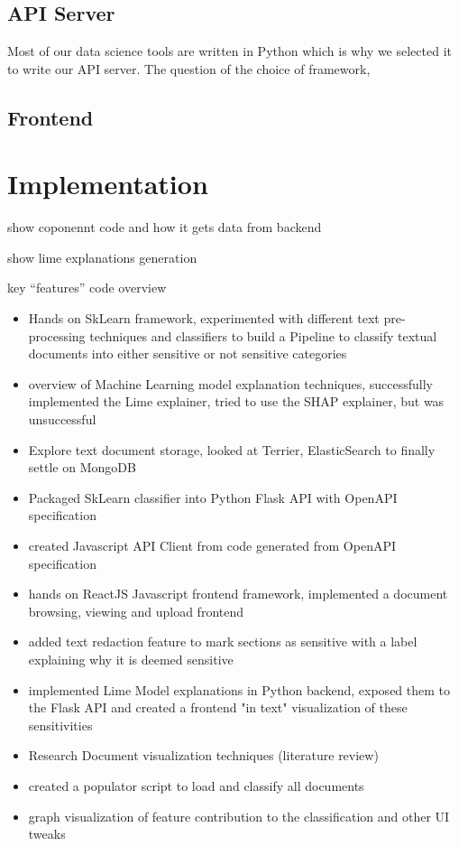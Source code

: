 \documentclass{l4proj}
\begin{document}
\section{API Server}

Most of our data science tools are written in Python which is why we selected it to write our API server.
The question of the choice of framework, 


\section{Frontend}

\chapter{Implementation}

show coponennt code and how it gets data from backend

show lime explanations generation

key ``features'' code overview


\begin{itemize}
    \item Hands on SkLearn framework, experimented with different text pre-processing techniques and classifiers to build a Pipeline to classify textual documents into either sensitive or not sensitive categories
    \item overview of Machine Learning model explanation techniques, successfully implemented the Lime explainer, tried to use the SHAP explainer, but was unsuccessful
    \item Explore text document storage, looked at Terrier, ElasticSearch to finally settle on MongoDB
    \item Packaged SkLearn classifier into Python Flask API with OpenAPI specification
    \item created Javascript API Client from code generated from OpenAPI specification
    \item hands on ReactJS Javascript frontend framework, implemented a document browsing, viewing and upload frontend
    \item added text redaction feature to mark sections as sensitive with a label explaining why it is deemed sensitive
    \item implemented Lime Model explanations in Python backend, exposed them to the Flask API and created a frontend "in text" visualization of these sensitivities
    \item Research Document visualization techniques (literature review)
    \item created a populator script to load and classify all documents
    \item graph visualization of feature contribution to the classification and other UI tweaks
\end{itemize}
\end{document}
